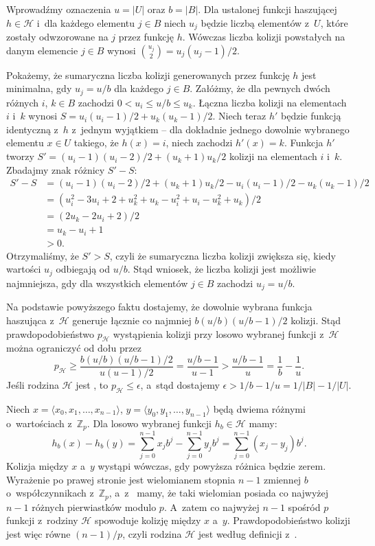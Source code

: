 \exercise %
Wprowadźmy oznaczenia $u=|U|$ oraz $b=|B|$.
Dla ustalonej funkcji haszującej $h\in\mathcal{H}$ i~dla każdego elementu $j\in B$ niech $u_j$ będzie liczbą elementów z~$U$, które zostały odwzorowane na $j$ przez funkcję $h$.
Wówczas liczba kolizji powstałych na danym elemencie $j\in B$ wynosi $\binom{u_j}{2}=u_j(u_j-1)/2$.

Pokażemy, że sumaryczna liczba kolizji generowanych przez funkcję $h$ jest minimalna, gdy $u_j=u/b$ dla każdego $j\in B$.
Załóżmy, że dla pewnych dwóch różnych $i$, $k\in B$ zachodzi $0<u_i\le u/b\le u_k$.
Łączna liczba kolizji na elementach $i$ i~$k$ wynosi $S=u_i(u_i-1)/2+u_k(u_k-1)/2$.
Niech teraz $h'$ będzie funkcją identyczną z~$h$ z~jednym wyjątkiem -- dla dokładnie jednego dowolnie wybranego elementu $x\in U$ takiego, że $h(x)=i$, niech zachodzi $h'(x)=k$.
Funkcja $h'$ tworzy $S'=(u_i-1)(u_i-2)/2+(u_k+1)u_k/2$ kolizji na elementach $i$ i~$k$.
Zbadajmy znak różnicy $S'-S$:
\begin{align*}
	S'-S &= (u_i-1)(u_i-2)/2+(u_k+1)u_k/2-u_i(u_i-1)/2-u_k(u_k-1)/2 \\
	&= (u_i^2-3u_i+2+u_k^2+u_k-u_i^2+u_i-u_k^2+u_k)/2 \\
	&= (2u_k-2u_i+2)/2 \\
	&= u_k-u_i+1 \\
	&> 0.
\end{align*}
Otrzymaliśmy, że $S'>S$, czyli że sumaryczna liczba kolizji zwiększa się, kiedy wartości $u_j$ odbiegają od $u/b$.
Stąd wniosek, że liczba kolizji jest możliwie najmniejsza, gdy dla wszystkich elementów $j\in B$ zachodzi $u_j=u/b$.

Na podstawie powyższego faktu dostajemy, że dowolnie wybrana funkcja haszująca z~$\mathcal{H}$ generuje łącznie co najmniej $b(u/b)(u/b-1)/2$ kolizji.
Stąd prawdopodobieństwo $p_{\mathcal{H}}$ wystąpienia kolizji przy losowo wybranej funkcji z~$\mathcal{H}$ można ograniczyć od dołu przez
\[
	p_{\mathcal{H}} \ge \frac{b(u/b)(u/b-1)/2}{u(u-1)/2} = \frac{u/b-1}{u-1} > \frac{u/b-1}{u} = \frac{1}{b}-\frac{1}{u}.
\]
Jeśli rodzina $\mathcal{H}$ jest , to $p_{\mathcal{H}}\le\epsilon$, a~stąd dostajemy $\epsilon>1/b-1/u=1/|B|-1/|U|$.

\exercise %
Niech $x=\langle x_0,x_1,\dots,x_{n-1}\rangle$, $y=\langle y_0,y_1,\dots,y_{n-1}\rangle$ będą dwiema różnymi  o~wartościach z~$\mathbb{Z}_p$.
Dla losowo wybranej funkcji $h_b\in\mathcal{H}$ mamy:
\[
	h_b(x)-h_b(y) = \sum_{j=0}^{n-1}x_jb^j-\sum_{j=0}^{n-1}y_jb^j = \sum_{j=0}^{n-1}(x_j-y_j)b^j.
\]
Kolizja między $x$ a~$y$ wystąpi wówczas, gdy powyższa różnica będzie zerem.
Wyrażenie po prawej stronie jest wielomianem stopnia $n-1$ zmiennej $b$ o~współczynnikach z~$\mathbb{Z}_p$, a~z~ mamy, że taki wielomian posiada co najwyżej $n-1$ różnych pierwiastków modulo $p$.
A~zatem co najwyżej $n-1$ spośród $p$ funkcji z~rodziny $\mathcal{H}$ spowoduje kolizję między $x$ a~$y$.
Prawdopodobieństwo kolizji jest więc równe $(n-1)/p$, czyli rodzina $\mathcal{H}$ jest  według definicji z~.

